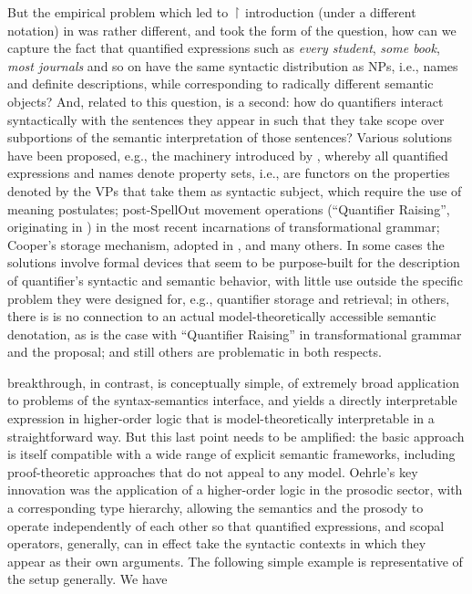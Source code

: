 \documentclass[output=paper,colorlinks,citecolor=brown]{langscibook}
\begin{document}
But the empirical problem which led to \ensuremath{\vs} introduction (under a different
notation) in \citet{oehrle1994} was rather different, and took the form of
the question, how can we capture the fact that quantified expressions
such as \textit{every student}, \textit{some book}, \textit{most journals} and so on have
the same syntactic distribution as NPs, i.e., names and definite
descriptions, while corresponding to radically different semantic
objects? And, related to this question, is a second: how do
quantifiers interact syntactically with the sentences they appear in
such that they take scope over subportions of the semantic
interpretation of those sentences? Various solutions have been
proposed, e.g., the machinery introduced by \citet{montague1973a}, whereby all quantified expressions and
names denote property sets, i.e., are functors on the properties
denoted by the VPs that take them as syntactic subject, which require
the use of meaning postulates; post-SpellOut
movement operations (``Quantifier Raising'', originating in
\citet{may_r1985a}) in the most recent incarnations of transformational
grammar; Cooper's \citeyearpar{cooper75,Cooper83}
storage mechanism, adopted in \citet{pollardsag94}, and many others. In
some cases the solutions involve formal devices that seem to be
purpose-built for the description of quantifier's syntactic and
semantic behavior, with little use outside the specific problem they
were designed for, e.g., quantifier storage and retrieval; in others,
there is is no connection to an actual model-theoretically accessible
semantic denotation, as is the case with ``Quantifier Raising'' in
transformational grammar and the \citet{pollardsag94} proposal; and still
others are problematic in both respects.

 breakthrough, in contrast, is conceptually simple, of
extremely broad application to problems of the syntax-semantics
interface, and yields a directly interpretable expression in
higher-order logic that is model-theoretically interpretable in a
straightforward way. But this last point needs to be amplified: the
basic approach is itself compatible with a wide range of explicit
semantic frameworks, including proof-theoretic approaches that do not
appeal to any model. Oehrle's key innovation was the application of a
higher-order logic in the prosodic sector, with a corresponding type
hierarchy, allowing the semantics and the prosody to operate
independently of each other so that quantified expressions, and scopal
operators, generally, can in effect take the syntactic contexts in
which they appear as their own arguments. The following simple example
is representative of the setup generally. We have
\end{document}
